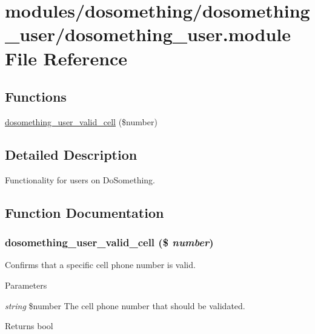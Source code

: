 \hypertarget{dosomething__user_8module}{
\section{modules/dosomething/dosomething\_\-user/dosomething\_\-user.module File Reference}
\label{dosomething__user_8module}
}
\subsection*{Functions}
\begin{DoxyCompactItemize}
\item 
\hyperlink{dosomething__user_8module_ae2ee3bafb69f17cb8cc4014d22f155c2}{dosomething\_\-user\_\-valid\_\-cell} (\$number)
\end{DoxyCompactItemize}


\subsection{Detailed Description}
Functionality for users on DoSomething. 

\subsection{Function Documentation}
\hypertarget{dosomething__user_8module_ae2ee3bafb69f17cb8cc4014d22f155c2}{
\subsubsection[{dosomething\_\-user\_\-valid\_\-cell}]{\setlength{\rightskip}{0pt plus 5cm}dosomething\_\-user\_\-valid\_\-cell (\$ {\em number})}}
\label{dosomething__user_8module_ae2ee3bafb69f17cb8cc4014d22f155c2}
Confirms that a specific cell phone number is valid.


\begin{DoxyParams}{Parameters}
\item[{\em string}]\$number The cell phone number that should be validated. \end{DoxyParams}
\begin{DoxyReturn}{Returns}
bool 
\end{DoxyReturn}
